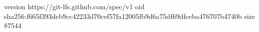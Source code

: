 version https://git-lfs.github.com/spec/v1
oid sha256:f665f393deb9cc42233d70cef57fa12005fb9d6a75df69dfceba476707b4740b
size 87544
